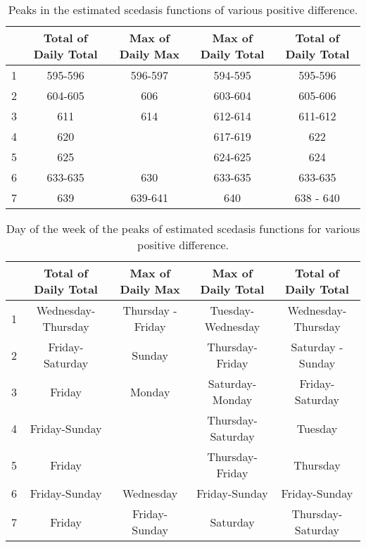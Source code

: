 \documentclass[a4paper]{article}
\begin{document}
\begin{table}
\centering
\begin{tabular}{|c|c|c|c|c|}
\hline
 & Total of Daily Total & Max of Daily Max & Max of Daily Total & Total of Daily Total \\
 \hline
1 & 595-596 & 596-597 & 594-595 & 595-596 \\
2 & 604-605 & 606 & 603-604 & 605-606 \\
3 & 611 & 614 & 612-614 & 611-612 \\ 
4 & 620 & & 617-619 & 622 \\
5 & 625 & & 624-625 & 624 \\
6 & 633-635 & 630 & 633-635 & 633-635 \\
7 & 639 & 639-641 & 640 & 638 - 640 \\
\hline
\end{tabular}
\caption{Peaks in the estimated scedasis functions of various positive difference.}
\label{tab:pos_diff_sced}
\end{table}

\begin{table}
\centering
\begin{tabular}{|c|c|c|c|c|}
\hline
 & Total of Daily Total & Max of Daily Max & Max of Daily Total & Total of Daily Total \\
 \hline
1 & Wednesday- Thursday & Thursday - Friday & Tuesday-Wednesday & Wednesday-Thursday \\
2 & Friday-Saturday & Sunday & Thursday-Friday & Saturday - Sunday \\
3 & Friday & Monday & Saturday-Monday & Friday-Saturday \\ 
4 & Friday-Sunday & & Thursday-Saturday & Tuesday \\
5 & Friday & & Thursday-Friday & Thursday \\
6 & Friday-Sunday & Wednesday & Friday-Sunday & Friday-Sunday \\
7 & Friday & Friday-Sunday & Saturday & Thursday-Saturday \\
\hline
\end{tabular}
\caption{Day of the week of the peaks of estimated scedasis functions for various positive difference.}
\label{tab:pos_diff_scedd}
\end{table}


\end{document}
